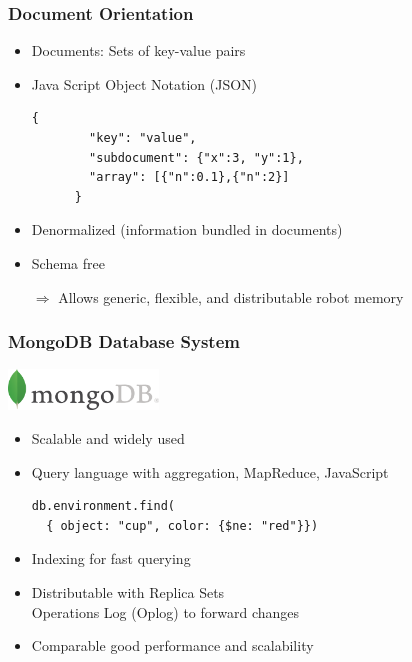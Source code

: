 \begin{frame}[fragile]
  \frametitle{Document Orientation}
  \begin{itemize}
  \item Documents: Sets of key-value pairs
  \item Java Script Object Notation (JSON)
    \begin{lstlisting}[style=SmallJSON,linewidth=8.5cm,
      label=lst:json,
      framexleftmargin=1pt, xleftmargin=0pt,
      morekeywords={}, numbers=none]
      {
        "key": "value",
        "subdocument": {"x":3, "y":1},
        "array": [{"n":0.1},{"n":2}]
      }
    \end{lstlisting}
  \item Denormalized (information bundled in documents)
  \item Schema free
  \end{itemize}
  \begin{itemize}
  \item[$\Rightarrow$] Allows generic, flexible, and distributable robot memory
  \end{itemize}
\end{frame}

\begin{frame}[fragile]
  \frametitle{MongoDB Database System}
  \hfill\includegraphics[width=0.3\textwidth]{../thesis/img/mongodb}
  \begin{itemize}
    \item Scalable and widely used
    \item Query language with aggregation, MapReduce, JavaScript %
\begin{lstlisting}[style=SmallJSON,linewidth=8.5cm,
  framexleftmargin=2pt, xleftmargin=10pt,
 morekeywords={}, numbers=none]
db.environment.find(
  { object: "cup", color: {$ne: "red"}})
\end{lstlisting}%
    \item Indexing for fast querying
    \item Distributable with Replica Sets\\ %
      Operations Log (Oplog) to forward changes
    \item Comparable good performance and scalability\\\cite{arango-vs-mongo,db-comparison}
  \end{itemize}
\end{frame}

